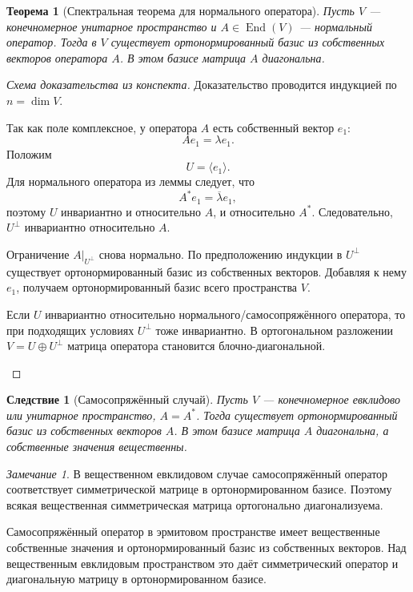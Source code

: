 \documentclass[12pt,a4paper]{article}
\theoremstyle{definition}
\theoremstyle{plain}
\newtheorem{theorem}[definition]{Теорема}
\newtheorem{corollary}[definition]{Следствие}
\theoremstyle{remark}
\newtheorem{remark}[definition]{Замечание}
\newenvironment{knowledgefix}{\begin{clarifybox}}{\end{clarifybox}}
\newcommand{\End}{\operatorname{End}}
\begin{document}
\begin{theorem}[Спектральная теорема для нормального оператора]
Пусть $V$ --- конечномерное унитарное пространство и $A\in\End(V)$ --- нормальный оператор.
Тогда в $V$ существует ортонормированный базис из собственных векторов оператора $A$.
В этом базисе матрица $A$ диагональна.
\end{theorem}

\begin{proof}[Схема доказательства из конспекта]
Доказательство проводится индукцией по $n=\dim V$.

Так как поле комплексное, у оператора $A$ есть собственный вектор $e_1$:
\[
    Ae_1=\lambda e_1.
\]
Положим
\[
    U=\langle e_1\rangle.
\]
Для нормального оператора из леммы следует, что
\[
    A^*e_1=\overline\lambda e_1,
\]
поэтому $U$ инвариантно и относительно $A$, и относительно $A^*$.
Следовательно, $U^\perp$ инвариантно относительно $A$.

Ограничение $A|_{U^\perp}$ снова нормально. По предположению индукции в $U^\perp$ существует ортонормированный базис из собственных векторов.
Добавляя к нему $e_1$, получаем ортонормированный базис всего пространства $V$.
\begin{knowledgefix}
Если \(U\) инвариантно относительно нормального/самосопряжённого оператора, то при подходящих условиях \(U^\perp\) тоже инвариантно. В ортогональном разложении \(V=U\oplus U^\perp\) матрица оператора становится блочно-диагональной.
\end{knowledgefix}
\end{proof}

\begin{corollary}[Самосопряжённый случай]
Пусть $V$ --- конечномерное евклидово или унитарное пространство, $A=A^*$.
Тогда существует ортонормированный базис из собственных векторов $A$.
В этом базисе матрица $A$ диагональна, а собственные значения вещественны.
\end{corollary}

\begin{remark}
В вещественном евклидовом случае самосопряжённый оператор соответствует симметрической матрице в ортонормированном базисе.
Поэтому всякая вещественная симметрическая матрица ортогонально диагонализуема.
\begin{knowledgefix}
Самосопряжённый оператор в эрмитовом пространстве имеет вещественные собственные значения и ортонормированный базис из собственных векторов. Над вещественным евклидовым пространством это даёт симметрический оператор и диагональную матрицу в ортонормированном базисе.
\end{knowledgefix}
\end{remark}
\end{document}
